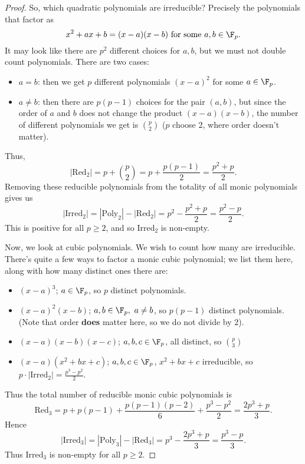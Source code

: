 \documentclass[math1530-lecture-notes]{subfiles}
\begin{document}
\begin{proof}[Proof]
  So, which quadratic polynomials are irreducible? Precisely the polynomials that factor as \[
    x^2+ax+b=(x-a)(x-b)~\text{for some}~a,b\in \F_p
  .\] It may look like there are $p^2$ different choices for $a,b$, but we must not double count
  polynomials. There are two cases:
  \begin{itemize}
    \item $a=b$: then we get $p$ different polynomials $(x-a)^2$ for some $a\in \F_p$.
    \item $a\neq b$: then there are $p(p-1)$ choices for the pair $(a,b)$, but since the order of
      $a$ and $b$ does not change the product $(x-a)(x-b)$, the number of different polynomials we
      get is $\binom{p}{2}$ ($p$ choose $2$, where order doesn't matter).
  \end{itemize}
  Thus, \[
    \left| \text{Red}_2 \right| =p+\binom{p}{2}=p+\frac{p(p-1)}{2}=\frac{p^2+p}{2}
  .\] Removing these reducible polynomials from the totality of all monic polynomials gives us
  \[
    \left| \text{Irred}_2 \right| =\left| \text{Poly}_2 \right| -\left| \text{Red}_2 \right|
    =p^2-\frac{p^2+p}{2}=\frac{p^2-p}{2}
  .\] This is positive for all $p\ge 2$, and so $\text{Irred}_2$ is non-empty.

  Now, we look at cubic polynomials. We wish to count how many are irreducible. There's quite a few
  ways to factor a monic cubic polynomial; we list them here, along with how many distinct ones
  there are:
  \begin{itemize}
    \item $(x-a)^3$; $a\in \F_p$, so $p$ distinct polynomials.
    \item $(x-a)^2(x-b)$; $a,b\in \F_p,\ a\neq b$, so $p(p-1)$ distinct polynomials. (Note that
      order \textbf{does} matter here, so we do not divide by $2$).
    \item $(x-a)(x-b)(x-c)$; $a,b,c\in \F_p$, all distinct, so $\binom{p}{3}$
    \item $(x-a)(x^2+bx+c)$; $a,b,c\in \F_p$, $x^2+bx+c$ irreducible, so $p\cdot \left|
      \text{Irred}_2 \right| =\frac{p^3-p^2}{2}$.
  \end{itemize}
  Thus the total number of reducible monic cubic polynomials is \[
    \text{Red}_3=p+p(p-1)+\frac{p(p-1)(p-2)}{6}+\frac{p^3-p^2}{2}=\frac{2p^3+p}{3}
  .\] Hence \[
  \left| \text{Irred}_3 \right|=\left| \text{Poly}_3 \right| -\left| \text{Red}_3 \right|
  =p^3-\frac{2p^3+p}{3}=\frac{p^3-p}{3}
  .\] Thus $\text{Irred}_3$ is non-empty for all $p\ge 2$.
\end{proof}
\end{document}
